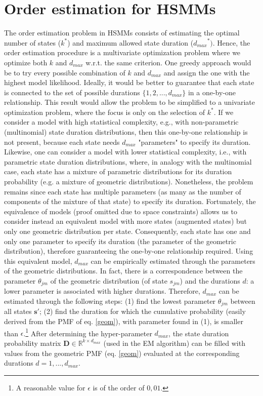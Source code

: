 \documentclass[extendedabs]{recpad2k}
\begin{document}
\section{Order estimation for HSMMs}
\label{sec:order}
The order estimation problem in HSMMs consists of estimating the optimal number of states ($k^*$) and maximum allowed state duration (${d_{max}}^*)$.  Hence, the order estimation procedure is a multivariate optimization problem where we optimize both $k$ and $d_{max}$ w.r.t. the same criterion. 
One greedy approach would be to try every possible combination of $k$ and $d_{max}$ and assign the one with the highest model likelihood. %
Ideally, it would be better to guarantee that each state is connected to the set of possible durations $\{1,2,...,d_{max}\}$ in a one-by-one relationship.  This result would allow the problem to be simplified to a univariate optimization problem, where the focus is only on the selection of $k^*$. If we consider a model with high statistical complexity, e.g., with non-parametric (multinomial) state duration distributions, then this one-by-one relationship is not present, because each state needs $d_{max}$ "parameters" to specify its duration. Likewise, one can consider a model with lower statistical complexity, i.e., with parametric state duration distributions, where, in analogy with the multinomial case, each state has a mixture of parametric distributions for its duration probability (e.g. a mixture of geometric distributions). Nonetheless, the problem remains since each state has multiple parameters (as many as the number of components of the mixture of that state) to specify its duration. Fortunately, the equivalence of models (proof omitted due to space constraints) allows us to consider instead an equivalent model with more states (augmented states) but only one geometric distribution per state. Consequently, each state has one and only one parameter to specify its duration (the parameter of the geometric distribution), therefore guaranteeing the one-by-one relationship required. Using this equivalent model, $d_{max}$ can be empirically estimated through the parameters of the geometric distributions. In fact, there is a correspondence between the parameter $\theta_{jm}$ of the geometric distribution (of state $s_{jm}$) and the durations $d$: a lower parameter is associated with higher durations. Therefore, $d_{max}$ can be estimated through the following steps: (1) find the lowest parameter $\theta_{jm}$ between all states $\mathbf{s'}$; (2) find the duration for which the cumulative probability (easily derived from the PMF of eq. \eqref{geom}), with parameter found in (1), is smaller than $\epsilon$.\footnote{A reasonable value for $\epsilon$ is of the order of $0,01$.} After determining the hyper-parameter $d_{max}$, the state duration probability matrix $\boldsymbol{D} \in \mathbb{R}^{k \times d_{max}}$ (used in the EM algorithm) can be filled with values from the geometric PMF (eq. \eqref{geom}) evaluated at the corresponding durations $d=1,...,d_{max}$. \\ \noindent
\end{document}
